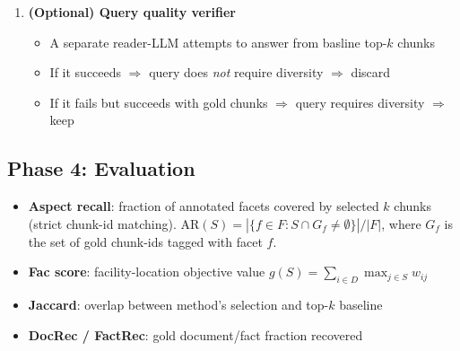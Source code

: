 \documentclass[11pt,a4paper]{article}
\newcommand{\phase}[2]{%
  \subsection*{\textcolor{betterblue}{#1}: #2}%
  \addcontentsline{toc}{subsection}{#1: #2}%
}
\begin{document}
\begin{enumerate}[leftmargin=*, itemsep=2mm]
	      \paragraph{Gold annotation via map-reduce.}
	      Since the corpus is heavily pruned before this stage (only conditions with the relevant ICD codes, only queries that pass the divergence filter), each per-condition candidate pool should not be too large. However, to face the long-context that the candidates may give rise to, we can:

	      \begin{enumerate}[itemsep=2pt, parsep=1pt]
		      \item \textbf{Map}: split the pool into batches of $\sim$50 chunks ($\sim$10K tokens).  For each batch, the LLM extracts facts relevant to the query, cites which chunk(s) each fact came from, and assigns a facet label to each citation.
		      \item \textbf{Reduce}: a merge pass synthesizes across batches, deduplicates facets, and produces the final gold answer with the complete (facet $\to$ chunk-ids) mapping.
	      \end{enumerate}

	\item \textbf{(Optional) Query quality verifier}
	      \begin{itemize}[itemsep=2pt, parsep=1pt]
		      \item A separate reader-LLM attempts to answer from basline top-$k$ chunks
		      \item If it succeeds $\Rightarrow$ query does \emph{not} require
		            diversity $\Rightarrow$ discard
		      \item If it fails but succeeds with gold chunks $\Rightarrow$
		            query requires diversity $\Rightarrow$ keep
	      \end{itemize}

\end{enumerate}

\phase{Phase 4}{Evaluation}
\label{sec:evaluation}

\begin{itemize}[itemsep=2pt, parsep=1pt]
	\item \textbf{Aspect recall}: fraction of annotated
	      facets covered by selected $k$ chunks (strict chunk-id matching).\newline
	      $\text{AR}(S) = |\{f \in F : S \cap G_f \neq \emptyset\}| / |F|$, where $G_f$ is the set of gold chunk-ids tagged with facet $f$.
	\item \textbf{Fac score}: facility-location objective value
	      $g(S) = \sum_{i \in D} \max_{j \in S} w_{ij}$
	\item \textbf{Jaccard}: overlap between method's selection and top-$k$ baseline
	\item \textbf{DocRec / FactRec}: gold document/fact fraction recovered
\end{itemize}
\end{document}
